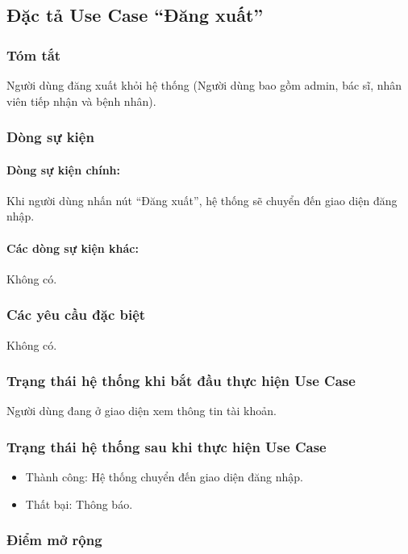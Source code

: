 \subsection{Đặc tả Use Case ``Đăng xuất''}

\subsubsection{Tóm tắt}
Người dùng đăng xuất khỏi hệ thống (Người dùng bao gồm admin, bác sĩ, nhân viên tiếp nhận và bệnh nhân).

\subsubsection{Dòng sự kiện}
\paragraph{\textbf{Dòng sự kiện chính:}}
Khi người dùng nhấn nút ``Đăng xuất'', hệ thống sẽ chuyển đến giao diện đăng nhập.

\paragraph{\textbf{Các dòng sự kiện khác:}}
Không có.

\subsubsection{Các yêu cầu đặc biệt}
Không có.

\subsubsection{Trạng thái hệ thống khi bắt đầu thực hiện Use Case}
Người dùng đang ở giao diện xem thông tin tài khoản.

\subsubsection{Trạng thái hệ thống sau khi thực hiện Use Case}
\begin{itemize}
    \item Thành công: Hệ thống chuyển đến giao diện đăng nhập.
    \item Thất bại: Thông báo.
\end{itemize}

\subsubsection{Điểm mở rộng}